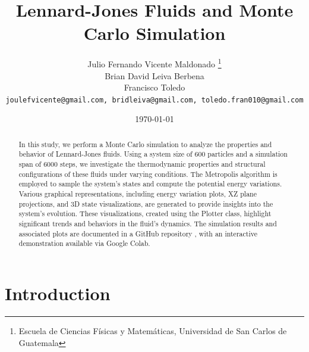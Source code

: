 \documentclass[a4paper,12pt]{article}
\title{Lennard-Jones Fluids and Monte Carlo Simulation}
\author{
    Julio Fernando Vicente Maldonado \thanks{Escuela de Ciencias Físicas y Matemáticas, Universidad de San Carlos de Guatemala} \\
     Brian David Leiva Berbena\footnotemark[1] \\
    Francisco Toledo\footnotemark[1] \\
    \texttt{joulefvicente@gmail.com, bridleiva@gmail.com, 
      toledo.fran010@gmail.com}
}
\date{\today}
\begin{document}
\maketitle
\begin{abstract}
In this study, we perform a Monte Carlo simulation to analyze the properties and behavior of Lennard-Jones fluids. Using a system size of 600 particles and a simulation span of 6000 steps, we investigate the thermodynamic properties and structural configurations of these fluids under varying conditions. The Metropolis algorithm is employed to sample the system's states and compute the potential energy variations. Various graphical representations, including energy variation plots, XZ plane projections, and 3D state visualizations, are generated to provide insights into the system's evolution. These visualizations, created using the Plotter class, highlight significant trends and behaviors in the fluid's dynamics. The simulation results and associated plots are documented in a  GitHub repository \cite{briandl2024}, with an interactive demonstration available via Google Colab.
\end{abstract}

 
\section{Introduction}
\end{document}
